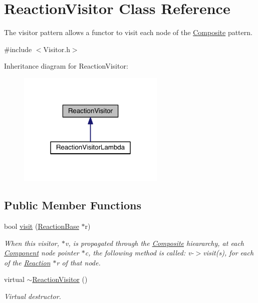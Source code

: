 \hypertarget{classReactionVisitor}{\section{Reaction\+Visitor Class Reference}
\label{classReactionVisitor}
}


The visitor pattern allows a functor to visit each node of the \hyperlink{classComposite}{Composite} pattern.  




{\ttfamily \#include $<$Visitor.\+h$>$}



Inheritance diagram for Reaction\+Visitor\+:\nopagebreak
\begin{figure}[H]
\begin{center}
\leavevmode
\includegraphics[width=199pt]{classReactionVisitor__inherit__graph}
\end{center}
\end{figure}
\subsection*{Public Member Functions}
\begin{DoxyCompactItemize}
\item 
bool \hyperlink{classReactionVisitor_a2a2381f0f0fcd0067537af8d965a32d3}{visit} (\hyperlink{classReactionBase}{Reaction\+Base} $\ast$r)
\begin{DoxyCompactList}\small\item\em When this visitor, $\ast$v, is propagated through the \hyperlink{classComposite}{Composite} hieararchy, at each \hyperlink{classComponent}{Component} node pointer $\ast$c, the following method is called\+: v-\/$>$visit(s), for each of the \hyperlink{classReaction}{Reaction} $\ast$r of that node. \end{DoxyCompactList}\item 
virtual \hyperlink{classReactionVisitor_a4d310d3c9165de0c33fc37e37406c242}{$\sim$\+Reaction\+Visitor} ()
\begin{DoxyCompactList}\small\item\em Virtual destructor. \end{DoxyCompactList}\end{DoxyCompactItemize}
